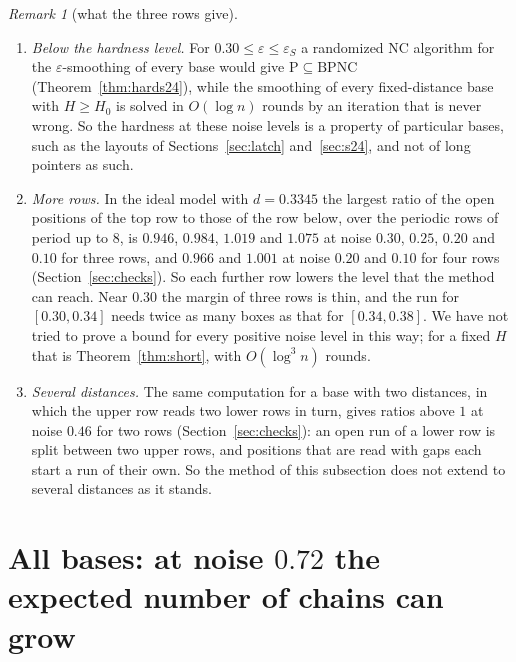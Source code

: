 \documentclass[11pt]{amsart}
\theoremstyle{definition}
\theoremstyle{remark}
\newtheorem{remark}[theorem]{Remark}
\newcommand{\eps}{\varepsilon}
\begin{document}
\begin{remark}[what the three rows give]\label{rem:rows3}
\begin{enumerate}[label=(\roman*),leftmargin=2.4em]
\item \emph{Below the hardness level.} For $0.30\le\eps\le\eps_S$ a randomized NC algorithm for
the $\eps$-smoothing of every base would give $\mathrm P\subseteq\mathrm{BPNC}$
(Theorem~\ref{thm:hards24}), while the smoothing of every fixed-distance base with $H\ge H_0$ is
solved in $O(\log n)$ rounds by an iteration that is never wrong. So the hardness at these noise
levels is a property of particular bases, such as the layouts of
Sections~\ref{sec:latch} and~\ref{sec:s24}, and not of long pointers as such.
\item \emph{More rows.} In the ideal model with $d=0.3345$ the largest ratio of the open positions
of the top row to those of the row below, over the periodic rows of period up to $8$, is
$0.946$, $0.984$, $1.019$ and $1.075$ at noise $0.30$, $0.25$, $0.20$ and $0.10$ for three rows,
and $0.966$ and $1.001$ at noise $0.20$ and $0.10$ for four rows (Section~\ref{sec:checks}). So
each further row lowers the level that the method can reach. Near $0.30$ the margin of three
rows is thin, and the run for $[0.30,0.34]$ needs twice as many boxes as that for $[0.34,0.38]$.
We have not tried to prove a bound
for every positive noise level in this way; for a fixed $H$ that is Theorem~\ref{thm:short}, with
$O(\log^3n)$ rounds.
\item \emph{Several distances.} The same computation for a base with two distances, in which the
upper row reads two lower rows in turn, gives ratios above $1$ at noise $0.46$ for two rows
(Section~\ref{sec:checks}): an open run of a lower row is split between two upper rows, and
positions that are read with gaps each start a run of their own. So the method of this subsection
does not extend to several distances as it stands.
\end{enumerate}
\end{remark}

\section{All bases: at noise \texorpdfstring{$0.72$}{0.72} the expected number of chains can grow}\label{sec:barrier}
\end{document}
